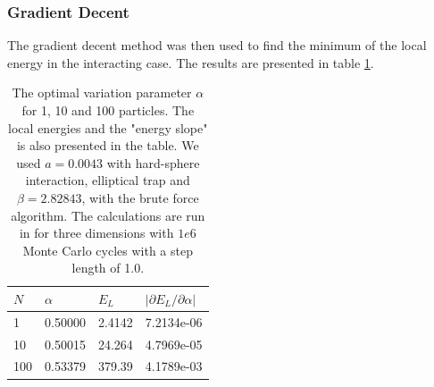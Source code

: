 \documentclass[norsk,a4paper,12pt]{article}
\begin{document}
\subsubsection{Gradient Decent} \label{sec:gd}
The gradient decent method was then used to find the minimum of the local energy in the interacting case. The results are presented in table \ref{tab:EL_calc_gradientdecent}.

\begin{table} [H]
	\centering
	\caption{The optimal variation parameter $\alpha$ for 1, 10 and 100 particles. The local energies and the "energy slope" is also presented in the table. We used $a=0.0043$  with hard-sphere interaction,  elliptical trap and $\beta=2.82843$, with the brute force algorithm. The calculations are run in for three dimensions with $1e6$ Monte Carlo cycles with a step length of 1.0.}
	\begin{tabularx}{\textwidth}{X|XXX} \hline
		\label{tab:EL_calc_gradientdecent}
		$N$ & $\alpha $ & $E_L$  & $|\partial E_L/\partial \alpha|$   \\ \hline
		1   & 0.50000  & 2.4142  &  7.2134e-06 \\
		10  & 0.50015  & 24.264  &  4.7969e-05 \\ 
		100 & 0.53379  & 379.39  &  4.1789e-03 \\ \hline
	\end{tabularx}
\end{table}

\iffalse
\end{document}
